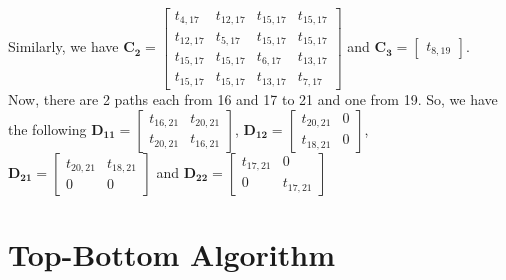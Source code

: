 Similarly, we have $\mathbf{C_2} = \begin{bmatrix}
   t_{4,17} & t_{12,17} & t_{15,17} & t_{15,17} \\
   t_{12,17} & t_{5,17} & t_{15,17} & t_{15,17} \\
   t_{15,17} & t_{15,17} & t_{6,17} & t_{13,17} \\
   t_{15,17} & t_{15,17} & t_{13,17} & t_{7,17} 
\end{bmatrix}$ and $\mathbf{C_{3}} = \begin{bmatrix} t_{8,19} \end{bmatrix} $. \\
Now, there are 2 paths each from 16 and 17 to 21 and one from 19. So, we have the following $\mathbf{D_{11}} = \begin{bmatrix}
    t_{16,21} & t_{20,21} \\
    t_{20,21} & t_{16,21}
\end{bmatrix}$, $\mathbf{D_{12}} = \begin{bmatrix}
    t_{20,21} & 0 \\
    t_{18,21} & 0
\end{bmatrix}$, $\mathbf{D_{21}} = \begin{bmatrix}
    t_{20,21} & t_{18,21} \\
    0 & 0
\end{bmatrix}$ and $\mathbf{D_{22}} = \begin{bmatrix}
    t_{17,21} & 0 \\
    0 & t_{17,21}
\end{bmatrix}$


\section{Top-Bottom Algorithm}

